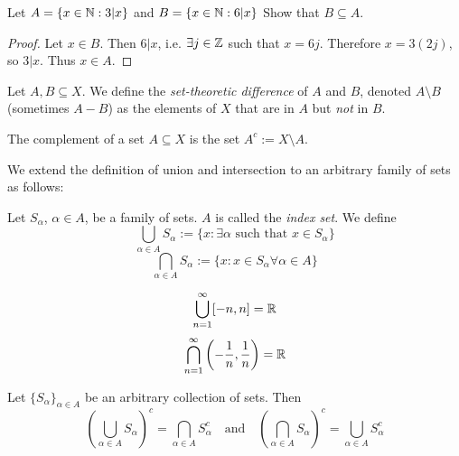 \documentclass{article}
\begin{document}
\begin{example}
Let $A = \{x \in {\mathbb{N}}: 3 | x \}$ and $B = \{x \in {\mathbb{N}}: 6 | x \}$
Show that $B \subseteq A$. 
\end{example}
\begin{proof}
Let $x \in B$. Then $6 |x$, i.e. $\exists j \in {\mathbb{Z}}$ such that $x = 6j$. Therefore $x = 3 (2j)$, so $3|x$. Thus $x \in A$.
\end{proof}

\begin{definition}
Let $A,B \subseteq X$. We define the \emph{set-theoretic difference} of $A$ and $B$, denoted $A \setminus B$ (sometimes $A-B$) as the elements of $X$ that are in $A$ but \emph{not} in $B$. 

The complement of a set $A \subseteq X$ is the set $A^c := X \setminus A$.
\end{definition}

We extend the definition of union and intersection to an arbitrary family of sets as follows:

\begin{definition}
Let $S_\alpha$, $\alpha \in A$, be a family of sets. $A$ is called the \emph{index set}. We define
\begin{equation*}
    \bigcup_{\alpha \in A} S_\alpha := \{ x: \exists \alpha \text{ such that } x \in S_\alpha \}
\end{equation*}
\begin{equation*}
    \bigcap_{\alpha \in A} S_\alpha := \{ x: x \in S_\alpha \forall \alpha \in A \}
\end{equation*}
\end{definition}

\begin{example}
$$\bigcup_{n=1}^\infty [-n,n] = {\mathbb{R}}$$
$$\bigcap_{n=1}^\infty \left( -\frac{1}{n},\frac{1}{n} \right) = {\mathbb{R}}$$
\end{example}



\begin{theorem}
Let $\{S_\alpha\}_{\alpha \in A}$ be an arbitrary collection of sets. Then 
\begin{equation*}
    \left( \bigcup_{\alpha \in A} S_\alpha \right)^c = \bigcap_{\alpha \in A}  S_\alpha^c \quad \text{and} \quad \left( \bigcap_{\alpha \in A} S_\alpha \right)^c = \bigcup_{\alpha \in A}  S_\alpha^c
\end{equation*}
\end{theorem}
\end{document}
